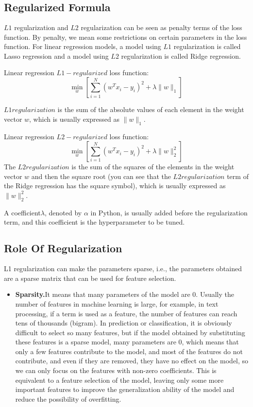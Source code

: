 \subsection{Regularized Formula}

$L1$ regularization and $L2$ regularization can be seen as penalty terms of the loss function. By penalty, we mean some restrictions on certain parameters in the loss function. For linear regression models, a model using $L1$ regularization is called Lasso regression and a model using $L2$ regularization is called Ridge regression.

Linear regression $L1-regularized$ loss function:
$$
\min _{w}\left[\sum_{i=1}^{N}\left(w^{T} x_{i}-y_{i}\right)^{2}+\lambda\|w\|_{1}\right]
$$

$L1 regularization$ is the sum of the absolute values of each element in the weight vector $w$, which is usually expressed as $\|w\|_{1}$.

Linear regression $L2-regularized$ loss function:
$$
\min _{w}\left[\sum_{i=1}^{N}\left(w^{T} x_{i}-y_{i}\right)^{2}+\lambda\|w\|_{2}^{2}\right]
$$
The $L2 regularization$ is the sum of the squares of the elements in the weight vector $w$ and then the square root (you can see that the $L2 regularization$ term of the Ridge regression has the square symbol), which is usually expressed as $\|w\|_{2}^{2}$.

A coefficient$\lambda$, denoted by $\alpha$ in Python, is usually added before the regularization term, and this coefficient is the hyperparameter to be tuned.

\subsection{Role Of Regularization}
L1 regularization can make the parameters sparse, i.e., the parameters obtained are a sparse matrix that can be used for feature selection.
\begin{itemize}
	\item \textbf{Sparsity.}It means that many parameters of the model are 0. Usually the number of features in machine learning is large, for example, in text processing, if a term is used as a feature, the number of features can reach tens of thousands (bigram). In prediction or classification, it is obviously difficult to select so many features, but if the model obtained by substituting these features is a sparse model, many parameters are 0, which means that only a few features contribute to the model, and most of the features do not contribute, and even if they are removed, they have no effect on the model, so we can only focus on the features with non-zero coefficients. This is equivalent to a feature selection of the model, leaving only some more important features to improve the generalization ability of the model and reduce the possibility of overfitting.
\end{itemize}

